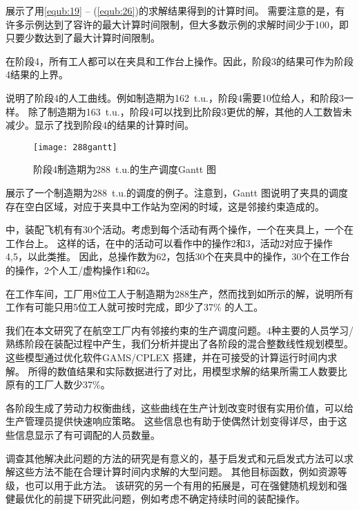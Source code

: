 展示了用\eqref{equb:19} -- (\ref{equb:26})的求解结果得到的计算时间。
需要注意的是，有许多示例达到了容许的最大计算时间限制，但大多数示例的求解时间少于100，即只要少数达到了最大计算时间限制。

在阶段4，所有工人都可以在夹具和工作台上操作。因此，阶段3的结果可作为阶段4结果的上界。
\begin{figure}[h]
\begin{floatrow}[2]
\centering
{}
\end{floatrow}
\end{figure}
说明了阶段4的人工曲线。例如制造期为162\ t.u.，阶段4需要10位给人，和阶段3一样。
除了制造期为163\ t.u.，阶段4可以找到比阶段3更优的解，其他的人工数皆未减少。显示了找到阶段4的结果的计算时间。
\begin{figure}[h]
\centering\caption{阶段4制造期为288\ t.u.的生产调度Gantt 图\label{fig:stage4gantt288}}
\texttt{[image: 288gantt]}
\end{figure}

展示了一个制造期为288\ t.u.的调度的例子。注意到，Gantt 图说明了夹具的调度存在空白区域，对应于夹具中工作站为空闲的时域，这是邻接约束造成的。

中，装配飞机有有30个活动。考虑到每个活动有两个操作，一个在夹具上，一个在工作台上。
这样的话，在中的活动可以看作中的操作2和3，活动2对应于操作4,5，以此类推。
因此，总操作数为62，包括30个在夹具中的操作，30个在工作台的操作，2个人工/虚构操作1和62。

在工作车间，工厂用8位工人于制造期为288生产，然而找到如所示的解，说明所有工作有可能只用5位工人就可按时完成，即少了37\% 的人工。


我们在本文研究了在航空工厂内有邻接约束的生产调度问题。4种主要的人员学习/熟练阶段在装配过程中产生，我们分析并提出了各阶段的混合整数线性规划模型。
这些模型通过优化软件GAMS/CPLEX 搭建，并在可接受的计算运行时间内求解。
所得的数值结果和实际数据进行了对比，用模型求解的结果所需工人数要比原有的工厂人数少37\%。

各阶段生成了劳动力权衡曲线，这些曲线在生产计划改变时很有实用价值，可以给生产管理员提供快速响应策略。
这些信息也有助于使偶然计划变得详尽，由于这些信息显示了有可调配的人员数量。

调查其他解决此问题的方法的研究是有意义的，基于启发式和元启发式方法可以求解这些方法不能在合理计算时间内求解的大型问题。
其他目标函数，例如资源等级，也可以用于此方法。
该研究的另一个有用的拓展是，可在强健随机规划和强健最优化的前提下研究此问题，例如考虑不确定持续时间的装配操作。